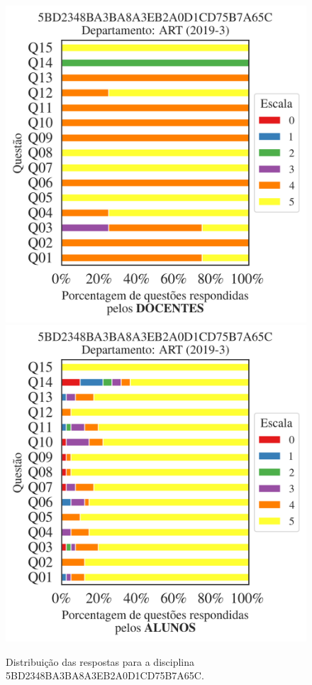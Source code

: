 \documentclass[a4paper,10pt]{article}
\begin{document}
\begin{figure}[h]
\centering
\includegraphics[width=0.485\linewidth]{analise_disciplina_departamento_ART_5BD2348BA3BA8A3EB2A0D1CD75B7A65C_docentes.png}
\includegraphics[width=0.485\linewidth]{analise_disciplina_departamento_ART_5BD2348BA3BA8A3EB2A0D1CD75B7A65C_alunos.png}
\caption{\label{fig:analise_geral_departamento}                Distribuição das respostas para a disciplina 5BD2348BA3BA8A3EB2A0D1CD75B7A65C. }
\end{figure}
\end{document}
